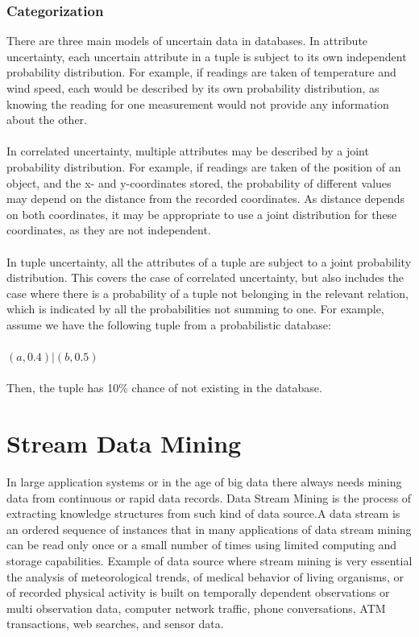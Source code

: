 \subsubsection{Categorization}
There are three main models of uncertain data in databases. In attribute uncertainty, each uncertain attribute in a tuple is subject to its own independent probability distribution. For example, if readings are taken of temperature and wind speed, each would be described by its own probability distribution, as knowing the reading for one measurement would not provide any information about the other.
\paragraph{}
In correlated uncertainty, multiple attributes may be described by a joint probability distribution. For example, if readings are taken of the position of an object, and the x- and y-coordinates stored, the probability of different values may depend on the distance from the recorded coordinates. As distance depends on both coordinates, it may be appropriate to use a joint distribution for these coordinates, as they are not independent.
\paragraph{}
In tuple uncertainty, all the attributes of a tuple are subject to a joint probability distribution. This covers the case of correlated uncertainty, but also includes the case where there is a probability of a tuple not belonging in the relevant relation, which is indicated by all the probabilities not summing to one. For example, assume we have the following tuple from a probabilistic database:
\paragraph{}
$(a, 0.4) | (b, 0.5)$
\paragraph{}
Then, the tuple has 10\% chance of not existing in the database.



\section{Stream Data Mining}
In large application systems or in the age of big data there always needs mining data from continuous or rapid data records. Data Stream Mining is the process of extracting knowledge structures from such kind of data source.A data stream is an ordered sequence of instances that in many applications of data stream mining can be read only once or a small number of times using limited computing and storage capabilities. Example of data source where stream mining is very essential the analysis of meteorological trends, of medical behavior of living organisms, or of recorded physical activity is built on temporally dependent observations or multi observation data, computer network traffic, phone conversations, ATM transactions, web searches, and sensor data.

